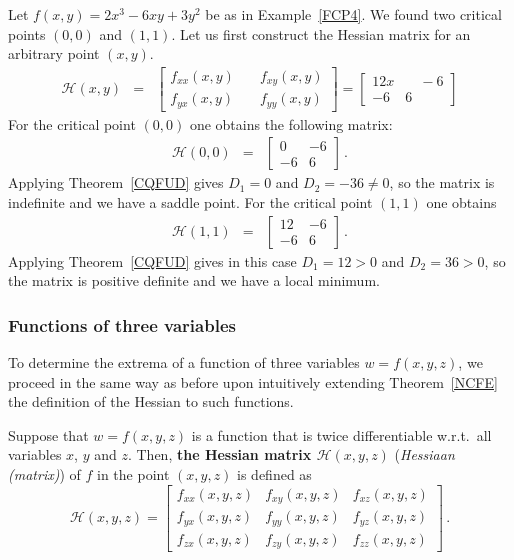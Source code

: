\begin{example}
\label{USDT2}
Let $f(x,y) = 2 x^3 - 6 x y + 3 y^2$ be as in Example~\ref{FCP4}. We found two critical points $(0,0)$ and $(1,1)$. Let us first construct the Hessian matrix for an arbitrary point $(x,y)$.
\begin{eqnarray*}
\mathscr{H}(x,y) &=& \begin{bmatrix} f_{xx}(x,y) & \quad f_{xy}(x,y) \\ f_{yx}(x,y) & \quad f_{yy}(x,y)  \end{bmatrix} =  \begin{bmatrix} 12x & \quad -6 \\  -6 & 6  \end{bmatrix}
\end{eqnarray*}
For the critical point $(0,0)$ one obtains the following matrix:
\begin{eqnarray*}
 \mathscr{H}(0,0) &=& \begin{bmatrix} 0 & -6 \\ -6 & 6  \end{bmatrix} \,.
\end{eqnarray*}
Applying Theorem~\ref{CQFUD} gives $D_1= 0$ and $D_2=-36 \neq 0$, so the matrix is indefinite and we have a saddle point. 
For the critical point $(1,1)$ one obtains 
\begin{eqnarray*} 
\mathscr{H}(1,1) &=& \begin{bmatrix} 12 & -6 \\ -6 & 6  \end{bmatrix}  \,.
\end{eqnarray*}
Applying Theorem~\ref{CQFUD} gives in this case $D_1=12>0$ and $D_2=36>0$, so the matrix is positive definite and we have a local minimum. 
\end{example}


\subsubsection{Functions of three variables}
To determine the extrema of a function of three variables $w=f(x,y,z)$, we proceed in the same way as before upon intuitively extending Theorem~\ref{NCFE} the definition of the Hessian to such functions.

\begin{definition}
\label{HM3}
Suppose that $w=f(x,y,z)$ is a function that is twice differentiable w.r.t.\ all variables $x$, $y$ and $z$. Then, \textbf{the Hessian matrix $\mathscr{H}(x,y,z)$} (\textit{Hessiaan (matrix)}) of $f$ in the point $(x,y,z)$ is defined as
$$ \mathscr{H}(x,y,z) =
\begin{bmatrix}  f_{xx}(x,y,z) & f_{xy}(x,y,z) & f_{xz}(x,y,z) \\  f_{yx}(x,y,z) & f_{yy}(x,y,z)&  f_{yz}(x,y,z)\\
f_{zx}(x,y,z)&f_{zy}(x,y,z)&f_{zz}(x,y,z)\end{bmatrix} \,. $$
\end{definition} 

